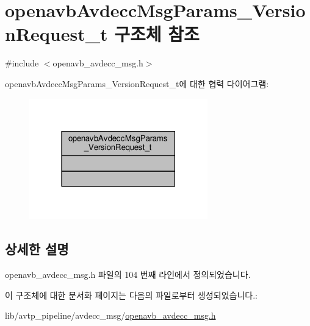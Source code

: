 \hypertarget{structopenavb_avdecc_msg_params___version_request__t}{}\section{openavb\+Avdecc\+Msg\+Params\+\_\+\+Version\+Request\+\_\+t 구조체 참조}
\label{structopenavb_avdecc_msg_params___version_request__t}


{\ttfamily \#include $<$openavb\+\_\+avdecc\+\_\+msg.\+h$>$}



openavb\+Avdecc\+Msg\+Params\+\_\+\+Version\+Request\+\_\+t에 대한 협력 다이어그램\+:
\nopagebreak
\begin{figure}[H]
\begin{center}
\leavevmode
\includegraphics[width=219pt]{structopenavb_avdecc_msg_params___version_request__t__coll__graph}
\end{center}
\end{figure}


\subsection{상세한 설명}


openavb\+\_\+avdecc\+\_\+msg.\+h 파일의 104 번째 라인에서 정의되었습니다.



이 구조체에 대한 문서화 페이지는 다음의 파일로부터 생성되었습니다.\+:\begin{DoxyCompactItemize}
\item 
lib/avtp\+\_\+pipeline/avdecc\+\_\+msg/\hyperlink{openavb__avdecc__msg_8h}{openavb\+\_\+avdecc\+\_\+msg.\+h}\end{DoxyCompactItemize}
